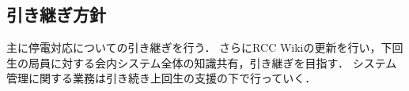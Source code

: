 \subsection*{引き継ぎ方針}

主に停電対応についての引き継ぎを行う．
さらにRCC Wikiの更新を行い，下回生の局員に対する会内システム全体の知識共有，引き継ぎを目指す．
システム管理に関する業務は引き続き上回生の支援の下で行っていく．
